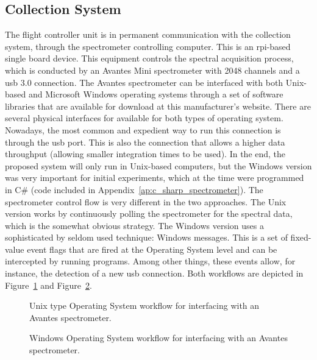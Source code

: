 \subsection{Collection System}%
\label{sub:methods_collection}

The flight controller unit is in permanent communication with the
collection system, through the spectrometer controlling computer. This
is an \gls{rpi}-based single board device. This equipment controls the
spectral acquisition process, which is conducted by an Avantes Mini
spectrometer with 2048 channels and a \gls{usb} 3.0 connection. The
Avantes spectrometer can be interfaced with both Unix-based and
Microsoft Windows operating systems through a set of software libraries
that are available for download at this manufacturer's website. There
are several physical interfaces for available for both types of
operating system. Nowadays, the most common and expedient way to run
this connection is through the \gls{usb} port. This is also the
connection that allows a higher data throughput (allowing smaller
integration times to be used). In the end, the proposed system will only
run in Unix-based computers, but the Windows version was very important
for initial experiments, which at the time were programmed in C\# (code
included in Appendix~\ref{ap:c_sharp_spectrometer}). The spectrometer
control flow is very different in the two approaches. The Unix version
works by continuously polling the spectrometer for the spectral data,
which is the somewhat obvious strategy. The Windows version uses a
sophisticated by seldom used technique: Windows messages. This is a set
of fixed-value event flags that are fired at the Operating System level
and can be intercepted by running programs. Among other things, these
events allow, for instance, the detection of a new \gls{usb} connection.
Both workflows are depicted in
Figure~\ref{fig:unix_spectrometer_workflow} and
Figure~\ref{fig:windows_spectrometer_workflow}. 

\begin{figure}[htpb]
    \centering
    \missingfigure{}
    \caption{Unix type Operating System workflow for interfacing with an
    Avantes spectrometer.}%
    \label{fig:unix_spectrometer_workflow}
\end{figure}

\begin{figure}[htpb]
    \centering
    \missingfigure{}
    \caption{Windows Operating System workflow for interfacing with an
    Avantes spectrometer.}%
    \label{fig:windows_spectrometer_workflow}
\end{figure}

